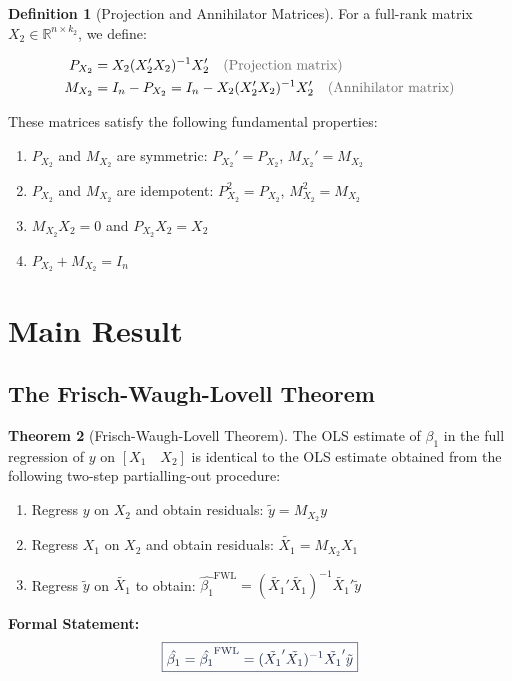 \documentclass[11pt,letterpaper]{article}
\theoremstyle{definition}
\newtheorem{theorem}{Theorem}[section]
\newtheorem{definition}[theorem]{Definition}
\newcommand{\R}{\mathbb{R}}
\begin{document}
\begin{definition}[Projection and Annihilator Matrices]\label{def:matrices}
For a full-rank matrix $X_2 \in \R^{n \times k_2}$, we define:

\begin{align}
P_{X_2} &= X_2(X_2'X_2)^{-1}X_2' \quad \text{\textcolor{lightgray}{(Projection matrix)}} \label{eq:projection} \\
M_{X_2} &= I_n - P_{X_2} = I_n - X_2(X_2'X_2)^{-1}X_2' \quad \text{\textcolor{lightgray}{(Annihilator matrix)}} \label{eq:annihilator}
\end{align}

\noindent These matrices satisfy the following fundamental properties:
\begin{enumerate}[label=\textcolor{accentblue}{(\roman*)}, itemsep=0.4em]
    \item $P_{X_2}$ and $M_{X_2}$ are symmetric: $P_{X_2}' = P_{X_2}$, $M_{X_2}' = M_{X_2}$
    \item $P_{X_2}$ and $M_{X_2}$ are idempotent: $P_{X_2}^2 = P_{X_2}$, $M_{X_2}^2 = M_{X_2}$
    \item $M_{X_2}X_2 = 0$ and $P_{X_2}X_2 = X_2$
    \item $P_{X_2} + M_{X_2} = I_n$
\end{enumerate}
\end{definition}

\section{Main Result}

\subsection{The Frisch-Waugh-Lovell Theorem}

\begin{theorem}[Frisch-Waugh-Lovell Theorem]\label{thm:fwl}
The OLS estimate of $\beta_1$ in the full regression of $y$ on $[X_1 \quad X_2]$ is identical to the OLS estimate obtained from the following two-step partialling-out procedure:

\begin{enumerate}[label=\textcolor{primaryblue}{\textbf{Step \arabic*:}}, itemsep=0.6em, leftmargin=3em]
    \item Regress $y$ on $X_2$ and obtain residuals: $\tilde{y} = M_{X_2}y$
    \item Regress $X_1$ on $X_2$ and obtain residuals: $\tilde{X_1} = M_{X_2}X_1$
    \item Regress $\tilde{y}$ on $\tilde{X_1}$ to obtain: $\hat{\beta_1}^{\text{FWL}} = (\tilde{X_1}'\tilde{X_1})^{-1}\tilde{X_1}'\tilde{y}$
\end{enumerate}

\vspace{0.5cm}
\noindent\textbf{\textcolor{primaryblue}{Formal Statement:}} 
\begin{equation}
\textcolor{primaryblue}{\boxed{\hat{\beta_1} = \hat{\beta_1}^{\text{FWL}} = (\tilde{X_1}'\tilde{X_1})^{-1}\tilde{X_1}'\tilde{y}}}
\end{equation}
\end{theorem}
\end{document}
